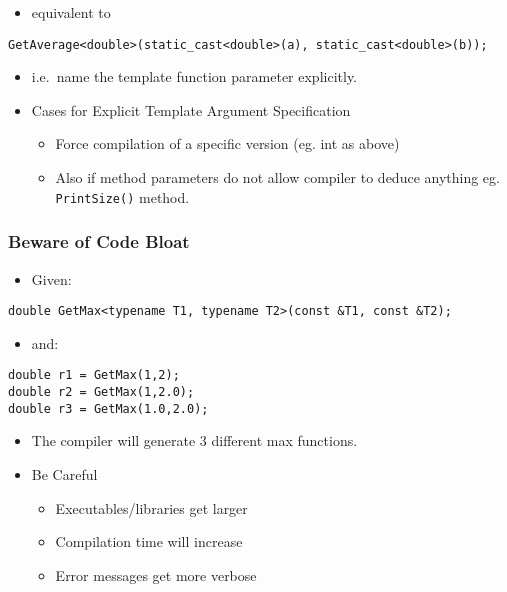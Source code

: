 \begin{itemize}
\tightlist
\item
  equivalent to
\end{itemize}

\texttt{GetAverage\textless{}double\textgreater{}(static\_cast\textless{}double\textgreater{}(a),\ static\_cast\textless{}double\textgreater{}(b));}

\begin{itemize}
\item
  i.e.~name the template function parameter explicitly.
\item
  Cases for Explicit Template Argument Specification

  \begin{itemize}
  \tightlist
  \item
    Force compilation of a specific version (eg. int as above)
  \item
    Also if method parameters do not allow compiler to deduce anything
    eg. \texttt{PrintSize()} method.
  \end{itemize}
\end{itemize}

\hypertarget{beware-of-code-bloat}{%
\subsubsection{Beware of Code Bloat}\label{beware-of-code-bloat}}

\begin{itemize}
\tightlist
\item
  Given:
\end{itemize}

\begin{verbatim}
double GetMax<typename T1, typename T2>(const &T1, const &T2);
\end{verbatim}

\begin{itemize}
\tightlist
\item
  and:
\end{itemize}

\begin{verbatim}
double r1 = GetMax(1,2);
double r2 = GetMax(1,2.0);
double r3 = GetMax(1.0,2.0);
\end{verbatim}

\begin{itemize}
\tightlist
\item
  The compiler will generate 3 different max functions.
\item
  Be Careful

  \begin{itemize}
  \tightlist
  \item
    Executables/libraries get larger
  \item
    Compilation time will increase
  \item
    Error messages get more verbose
  \end{itemize}
\end{itemize}

